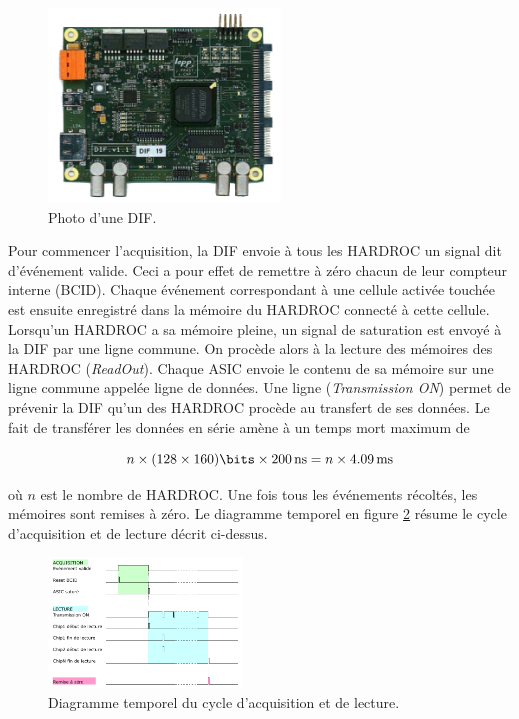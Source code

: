 \begin{figure}[ht!]
	\centering
	\includegraphics[width=0.55\textwidth]{GLA/DIF.png}
	\captionsetup{type=figure}\caption{Photo d'une DIF.}
	\label{DIF}
\end{figure}

Pour commencer l'acquisition, la DIF envoie à tous les HARDROC un signal dit d'événement valide. Ceci a pour effet de remettre à zéro chacun de leur compteur interne (BCID). Chaque événement correspondant à une cellule activée touchée est ensuite enregistré dans la mémoire du HARDROC connecté à cette cellule. Lorsqu'un HARDROC a sa mémoire pleine, un signal de saturation est envoyé à la DIF par une ligne commune. On procède alors à la lecture des mémoires des HARDROC (\textit{ReadOut}). Chaque ASIC envoie le contenu de sa mémoire sur une ligne commune appelée ligne de données. Une ligne (\textit{Transmission ON}) permet de prévenir la DIF qu'un des HARDROC procède au transfert de ses données. Le fait de transférer les données en série amène à un temps mort maximum de

\begin{equation}
n\times(128 \times 160)\si{\bits}\times \SI{200}{\nano\second}= n\times\SI{4.09}{\milli\second}
\end{equation} 

où $n$ est le nombre de HARDROC. Une fois tous les événements récoltés, les mémoires sont remises à zéro. Le diagramme temporel en figure \ref{temp} résume le cycle d'acquisition et de lecture décrit ci-dessus.

\begin{figure}[ht!]
	\centering
	\includegraphics[width=0.46\textwidth]{GLA/cycle.png}
	\captionsetup{type=figure}\caption{Diagramme temporel du cycle d'acquisition et de lecture.}
	\label{temp}
\end{figure}

